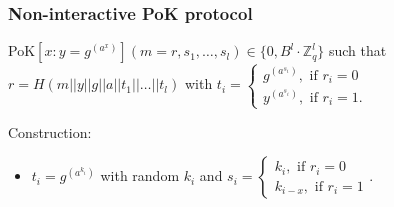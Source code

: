 \documentclass[11pt]{article}
\theoremstyle{definition}
\theoremstyle{proof}
\begin{document}
\subsubsection{Non-interactive PoK protocol}

PoK$[x: y = g^{(a^x)}](m = r, s_1, \dots, s_l) \in \{0, B^l \cdot \mathbb{Z}_q^l\}$ such that $r = H(m || y || g || a || t_1 || \dots || t_l)$ with $t_i = \begin{cases}
	g^{(a^{s_i})}, \text{ if } r_i = 0 \\
	y^{(a^{s_i})}, \text{ if } r_i = 1.
\end{cases}$

\noindent Construction:

\begin{itemize}
	\item $t_i = g^{(a^{k_i})}$ with random $k_i$ and $s_i = \begin{cases}
		k_i, \text{ if } r_i = 0 \\
		k_{i-x}, \text{ if } r_i = 1
	\end{cases}$.
\end{itemize}
\end{document}
